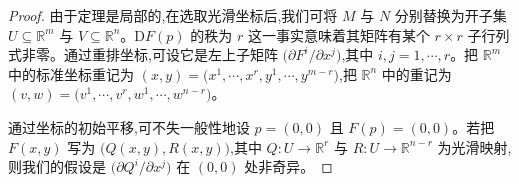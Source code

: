 \documentclass[../../main.tex]{subfiles}
\begin{document}
\begin{proof}
由于定理是局部的,在选取光滑坐标后,我们可将 $M$ 与 $N$ 分别替换为开子集 $U\subseteq\mathbb{R}^m$ 与 $V\subseteq\mathbb{R}^n$。$\mathrm{D}F(p)$ 的秩为 $r$ 这一事实意味着其矩阵有某个 $r\times r$ 子行列式非零。通过重排坐标,可设它是左上子矩阵 $\bigl(\partial F^i/\partial x^j\bigr)$,其中 $i,j=1,\cdots ,r$。把 $\mathbb{R}^m$ 中的标准坐标重记为 $(x,y)=\bigl(x^1,\cdots ,x^r,y^1,\cdots ,y^{m-r}\bigr)$,把 $\mathbb{R}^n$ 中的重记为 $(v,w)=\bigl(v^1,\cdots ,v^r,w^1,\cdots ,w^{n-r}\bigr)$。

通过坐标的初始平移,可不失一般性地设 $p=(0,0)$ 且 $F(p)=(0,0)$。若把 $F(x,y)$ 写为 $\bigl(Q(x,y),R(x,y)\bigr)$,其中 $Q:U\to\mathbb{R}^r$ 与 $R:U\to\mathbb{R}^{n-r}$ 为光滑映射,则我们的假设是 $\bigl(\partial Q^i/\partial x^j\bigr)$ 在 $(0,0)$ 处非奇异。


\end{proof}
\end{document}
